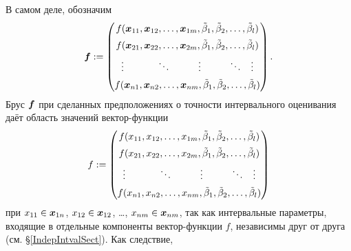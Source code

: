 \documentclass[a5paper,openany]{book}
\newcommand{\mbf}[1]{\protect\text{\boldmath$#1$}}
\begin{document}
В самом деле, обозначим 
\begin{equation*} 
\mbf{f} := 
\begin{pmatrix} 
f(\mbf{x}_{11}, \mbf{x}_{12}, \ldots, \mbf{x}_{1m}, 
            \tilde{\beta}_{1}, \tilde{\beta}_{2}, \ldots, \tilde{\beta}_{l}) \\[5pt] 
f(\mbf{x}_{21}, \mbf{x}_{22}, \ldots, \mbf{x}_{2m}, 
            \tilde{\beta}_{1}, \tilde{\beta}_{2}, \ldots, \tilde{\beta}_{l}) \\[5pt] 
\vdots\hspace{12mm}\ddots \hspace{10mm}  \vdots 
                                   \hspace{10mm}  \ddots \hspace{3mm} \vdots \\[5pt]
f(\mbf{x}_{n1}, \mbf{x}_{n2}, \ldots, \mbf{x}_{nm}, 
            \tilde{\beta}_{1}, \tilde{\beta}_{2}, \ldots, \tilde{\beta}_{l}) 
\end{pmatrix}. 
\end{equation*} 
Брус $\mbf{f}$ при сделанных предположениях о точности интервального оценивания 
даёт область значений вектор-функции 
\begin{equation} 
\label{VectorFunc} 
f := 
\begin{pmatrix} 
f(x_{11}, x_{12}, \ldots, x_{1m}, 
      \tilde{\beta}_{1}, \tilde{\beta}_{2}, \ldots, \tilde{\beta}_{l}) \\[5pt] 
f(x_{21}, x_{22}, \ldots, x_{2m}, 
      \tilde{\beta}_{1}, \tilde{\beta}_{2}, \ldots, \tilde{\beta}_{l}) \\[5pt] 
\vdots\hspace{12mm}\ddots \hspace{10mm}  \vdots 
                                   \hspace{10mm}  \ddots \hspace{3mm} \vdots \\[5pt]
f(x_{n1}, x_{n2}, \ldots, x_{nm}, 
            \tilde{\beta}_{1}, \tilde{\beta}_{2}, \ldots, \tilde{\beta}_{l}) 
\end{pmatrix} 
\end{equation} 
при $x_{11}\in\mbf{x}_{1n}$, $x_{12}\in\mbf{x}_{12}$, \ldots, $x_{nm}\in\mbf{x}_{nm}$, 
так как интервальные параметры, входящие в отдельные компоненты вектор-функции $f$, 
независимы друг от друга (см. \S\ref{IndepIntvalSect}). Как следствие, 
\end{document}
